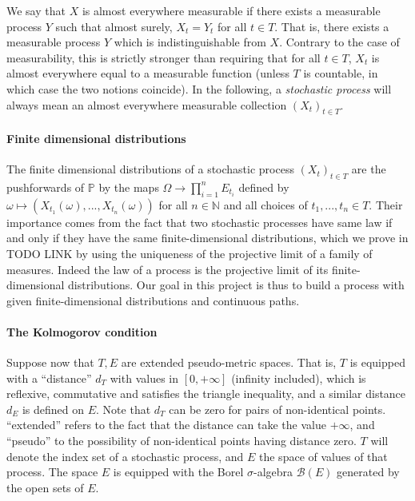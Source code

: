 \documentclass[lean]{Draft}
\begin{document}

We say that $X$ is almost everywhere measurable if there exists a measurable process $Y$ such that almost surely, $X_t = Y_t$ for all $t \in T$.
That is, there exists a measurable process $Y$ which is indistinguishable from $X$.
Contrary to the case of measurability, this is strictly stronger than requiring that for all $t \in T$, $X_t$ is almost everywhere equal to a measurable function (unless $T$ is countable, in which case the two notions coincide).
In the following, a \emph{stochastic process} will always mean an almost everywhere measurable collection $(X_t)_{t \in T}$.

\paragraph{Finite dimensional distributions}

The finite dimensional distributions of a stochastic process $(X_t)_{t \in T}$ are the pushforwards of $\mathbb{P}$ by the maps $\Omega \to \prod_{i=1}^n E_{t_i}$ defined by $\omega \mapsto (X_{t_1}(\omega),...,X_{t_n}(\omega))$ for all $n \in \mathbb{N}$ and all choices of $t_1,...,t_n \in T$.
Their importance comes from the fact that two stochastic processes have same law if and only if they have the same finite-dimensional distributions, which we prove in TODO LINK by using the uniqueness of the projective limit of a family of measures. Indeed the law of a process is the projective limit of its finite-dimensional distributions.
Our goal in this project is thus to build a process with given finite-dimensional distributions and continuous paths.

\paragraph{The Kolmogorov condition}

Suppose now that $T, E$ are extended pseudo-metric spaces.
That is, $T$ is equipped with a ``distance'' $d_T$ with values in $[0,+\infty]$ (infinity included), which is reflexive, commutative and satisfies the triangle inequality, and a similar distance $d_E$ is defined on $E$. Note that $d_T$ can be zero for pairs of non-identical points.
``extended'' refers to the fact that the distance can take the value $+\infty$, and ``pseudo'' to the possibility of non-identical points having distance zero.
$T$ will denote the index set of a stochastic process, and $E$ the space of values of that process.
The space $E$ is equipped with the Borel $\sigma$-algebra $\mathcal{B}(E)$ generated by the open sets of $E$.
\end{document}
